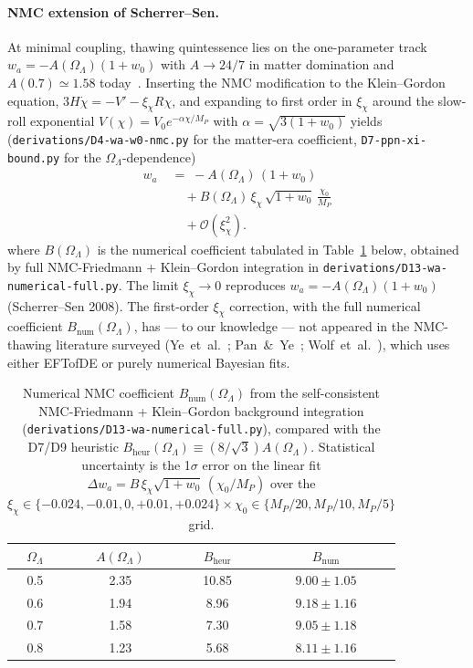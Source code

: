 \documentclass[epjc3,twocolumn]{svjour3}
\begin{document}
\paragraph{NMC extension of Scherrer--Sen.}
At minimal coupling, thawing quintessence lies on the one-parameter track
$w_a=-A(\Omega_\Lambda)(1+w_0)$ with $A\!\to\! 24/7$ in matter domination and
$A(0.7)\simeq 1.58$ today~\cite{ScherrerSen2008}. Inserting the NMC modification to the
Klein--Gordon equation, $3H\dot\chi=-V'-\xi_\chi R\chi$, and expanding to first order in
$\xi_\chi$ around the slow-roll exponential $V(\chi)=V_0e^{-\alpha\chi/M_P}$ with
$\alpha=\sqrt{3(1+w_0)}$ yields (\texttt{derivations/D4-wa-w0-nmc.py} for the matter-era
coefficient, \texttt{D7-ppn-xi-bound.py} for the $\Omega_\Lambda$-dependence)
\begin{align}
  w_a \;&=\; -A(\Omega_\Lambda)\,(1+w_0) \nonumber \\
       &\quad + B(\Omega_\Lambda)\,\xi_\chi\,\sqrt{1+w_0}\,\frac{\chi_0}{M_P} \nonumber \\
       &\quad + \mathcal{O}(\xi_\chi^{2}).
  \label{eq:wa_NMC}
\end{align}
where $B(\Omega_\Lambda)$ is the numerical coefficient tabulated in
Table~\ref{tab:B_of_OmegaL} below, obtained by full NMC-Friedmann + Klein--Gordon
integration in \texttt{derivations/D13-wa-numerical-full.py}. The limit
$\xi_\chi\to 0$ reproduces $w_a=-A(\Omega_\Lambda)(1+w_0)$ (Scherrer--Sen
2008). The first-order $\xi_\chi$ correction, with the full numerical
coefficient $B_{\mathrm{num}}(\Omega_\Lambda)$, has --- to our knowledge ---
not appeared in the NMC-thawing literature surveyed
(Ye~et~al.~\cite{Ye2025}; Pan~\&~Ye~\cite{PanYe2026}; Wolf~et~al.~\cite{Wolf2025}),
which uses either EFTofDE or purely numerical Bayesian fits.

\begin{table}[h]
\centering
\caption{Numerical NMC coefficient $B_{\mathrm{num}}(\Omega_\Lambda)$ from the
self-consistent NMC-Friedmann + Klein--Gordon background integration
(\texttt{derivations/D13-wa-numerical-full.py}), compared with the D7/D9
heuristic $B_{\mathrm{heur}}(\Omega_\Lambda)\equiv(8/\sqrt3)A(\Omega_\Lambda)$.
Statistical uncertainty is the 1$\sigma$ error on the linear fit
$\Delta w_a = B\,\xi_\chi\sqrt{1+w_0}\,(\chi_0/M_P)$ over the
$\xi_\chi\in\{{-}0.024,{-}0.01,0,{+}0.01,{+}0.024\}\times\chi_0\in\{M_P/20,M_P/10,M_P/5\}$ grid.}
\label{tab:B_of_OmegaL}
\begin{tabular}{cccc}
\hline
$\Omega_\Lambda$ & $A(\Omega_\Lambda)$ & $B_{\mathrm{heur}}$ & $B_{\mathrm{num}}$ \\
\hline
0.5 & 2.35 & 10.85 & $9.00\pm1.05$ \\
0.6 & 1.94 &  8.96 & $9.18\pm1.16$ \\
0.7 & 1.58 &  7.30 & $9.05\pm1.18$ \\
0.8 & 1.23 &  5.68 & $8.11\pm1.16$ \\
\hline
\end{tabular}
\end{table}
\end{document}
